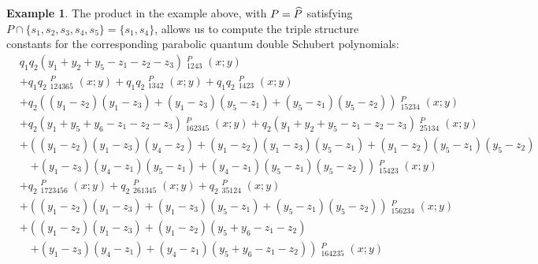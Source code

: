 \documentclass{amsart}
\theoremstyle{definition}
\newtheorem{example}[lemma]{Example}
\theoremstyle{remark}
\numberwithin{equation}{section}
\DeclareMathOperator{\qsch}{\widetilde{\mathfrak{S}}}
\begin{document}
\begin{example}
	The product in the example above, with $P=\widehat{P}$ satisfying $P\cap\{s_1,s_2,s_3,s_4,s_5\} = \{s_1,s_4\}$, allows us to compute the triple structure constants for the corresponding parabolic quantum double Schubert polynomials:
\begin{align*}
&q_{1} q_{2} \left(y_{1} + y_{2} + y_{5} - z_{1} - z_{2} - z_{3}\right) \qsch_{1243}^P{\left(x; y \right)} \\
&+ q_{1} q_{2} \qsch_{124365}^P{\left(x; y \right)} + q_{1} q_{2} \qsch_{1342}^P{\left(x; y \right)} + q_{1} q_{2} \qsch_{1423}^P{\left(x; y \right)} \\
&+ q_{2} \left(\left(y_{1} - z_{2}\right) \left(y_{1} - z_{3}\right) + \left(y_{1} - z_{3}\right) \left(y_{5} - z_{1}\right) + \left(y_{5} - z_{1}\right) \left(y_{5} - z_{2}\right)\right) \qsch_{15234}^P{\left(x; y \right)} \\
&+ q_{2} \left(y_{1} + y_{5} + y_{6} - z_{1} - z_{2} - z_{3}\right) \qsch_{162345}^P{\left(x; y \right)} + q_{2} \left(y_{1} + y_{2} + y_{5} - z_{1} - z_{2} - z_{3}\right) \qsch_{25134}^P{\left(x; y \right)} \\
&+ \left(\left(y_{1} - z_{2}\right) \left(y_{1} - z_{3}\right) \left(y_{4} - z_{2}\right) + \left(y_{1} - z_{2}\right) \left(y_{1} - z_{3}\right) \left(y_{5} - z_{1}\right) + \left(y_{1} - z_{2}\right) \left(y_{5} - z_{1}\right) \left(y_{5} - z_{2}\right) \right. \\
&\quad \left. + \left(y_{1} - z_{3}\right) \left(y_{4} - z_{1}\right) \left(y_{5} - z_{1}\right) + \left(y_{4} - z_{1}\right) \left(y_{5} - z_{1}\right) \left(y_{5} - z_{2}\right)\right) \qsch_{15423}^P{\left(x; y \right)} \\
&+ q_{2} \qsch_{1723456}^P{\left(x; y \right)} + q_{2} \qsch_{261345}^P{\left(x; y \right)} + q_{2} \qsch_{35124}^P{\left(x; y \right)} \\
&+ \left(\left(y_{1} - z_{2}\right) \left(y_{1} - z_{3}\right) + \left(y_{1} - z_{3}\right) \left(y_{5} - z_{1}\right) + \left(y_{5} - z_{1}\right) \left(y_{5} - z_{2}\right)\right) \qsch_{156234}^P{\left(x; y \right)} \\
&+ \left(\left(y_{1} - z_{2}\right) \left(y_{1} - z_{3}\right) + \left(y_{1} - z_{2}\right) \left(y_{5} + y_{6} - z_{1} - z_{2}\right) \right. \\
&\quad \left. + \left(y_{1} - z_{3}\right) \left(y_{4} - z_{1}\right) + \left(y_{4} - z_{1}\right) \left(y_{5} + y_{6} - z_{1} - z_{2}\right)\right) \qsch_{164235}^P{\left(x; y \right)} \\

\end{align*}
\end{example}
\end{document}
